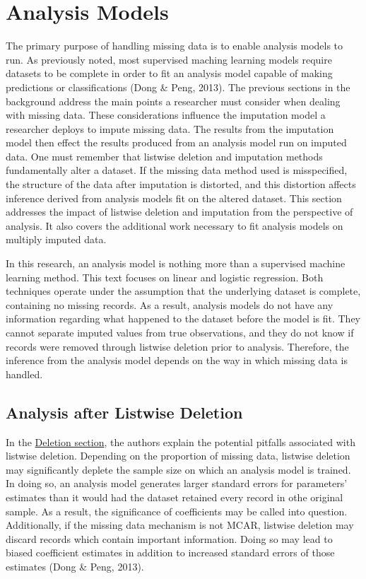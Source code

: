 \documentclass[12pt,oneside]{chicagocapstone}
\begin{document}
\section*{Analysis Models}\label{background-analysis}

The primary purpose of handling missing data is to enable analysis
models to run. As previously noted, most supervised maching learning
models require datasets to be complete in order to fit an analysis model
capable of making predictions or classifications (Dong \& Peng, 2013).
The previous sections in the background address the main points a
researcher must consider when dealing with missing data. These
considerations influence the imputation model a researcher deploys to
impute missing data. The results from the imputation model then effect
the results produced from an analysis model run on imputed data. One
must remember that listwise deletion and imputation methods
fundamentally alter a dataset. If the missing data method used is
misspecified, the structure of the data after imputation is distorted,
and this distortion affects inference derived from analysis models fit
on the altered dataset. This section addresses the impact of listwise
deletion and imputation from the perspective of analysis. It also covers
the additional work necessary to fit analysis models on multiply imputed
data.

In this research, an analysis model is nothing more than a supervised
machine learning method. This text focuses on linear and logistic
regression. Both techniques operate under the assumption that the
underlying dataset is complete, containing no missing records. As a
result, analysis models do not have any information regarding what
happened to the dataset before the model is fit. They cannot separate
imputed values from true observations, and they do not know if records
were removed through listwise deletion prior to analysis. Therefore, the
inference from the analysis model depends on the way in which missing
data is handled.

\subsection*{Analysis after Listwise
Deletion}\label{background-analysis-listwise}

In the \protect\hyperlink{background-deletion}{Deletion section}, the
authors explain the potential pitfalls associated with listwise
deletion. Depending on the proportion of missing data, listwise deletion
may significantly deplete the sample size on which an analysis model is
trained. In doing so, an analysis model generates larger standard errors
for parameters' estimates than it would had the dataset retained every
record in othe original sample. As a result, the significance of
coefficients may be called into question. Additionally, if the missing
data mechanism is not MCAR, listwise deletion may discard records which
contain important information. Doing so may lead to biased coefficient
estimates in addition to increased standard errors of those estimates
(Dong \& Peng, 2013).
\end{document}
